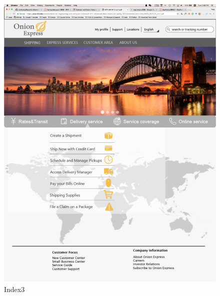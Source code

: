 \documentclass[12pt]{scrreprt}
\begin{document}
\begin{figure}[htbp]
  \centering\includegraphics[width=5in]{DocumentRes/index3.png}
  \caption{Index3}
\end{figure}
\end{document}
